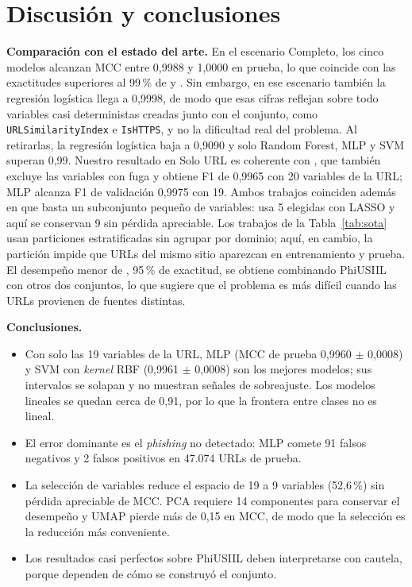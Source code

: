 \documentclass[journal]{IEEEtran}
\begin{document}
\section{Discusión y conclusiones}
\label{sec:conclusiones}
\textbf{Comparación con el estado del arte.} En el escenario Completo, los cinco modelos alcanzan MCC
entre 0,9988 y 1,0000 en prueba, lo que coincide con las exactitudes superiores al 99\,\% de
\cite{prasad2024} y \cite{bao2026}. Sin embargo, en ese escenario también la regresión logística
llega a 0,9998, de modo que esas cifras reflejan sobre todo variables casi deterministas creadas
junto con el conjunto, como \texttt{URLSimilarityIndex} e \texttt{IsHTTPS}, y no la dificultad real
del problema. Al retirarlas, la regresión logística baja a 0,9090 y solo Random Forest, MLP y
SVM superan 0,99. Nuestro resultado en Solo URL es coherente con \cite{yulianti2026}, que también
excluye las variables con fuga y obtiene F1 de 0,9965 con 20 variables de la URL; MLP alcanza F1 de
validación 0,9975 con 19. Ambos trabajos coinciden además en que basta un subconjunto pequeño de
variables: \cite{yulianti2026} usa 5 elegidas con LASSO y aquí se conservan 9 sin pérdida
apreciable. Los trabajos de la Tabla~\ref{tab:sota} usan particiones estratificadas sin agrupar por
dominio; aquí, en cambio, la partición impide que URLs del mismo sitio aparezcan en entrenamiento y
prueba. El desempeño menor de \cite{gobinath2026}, 95\,\%
de exactitud, se obtiene combinando PhiUSIIL con otros dos conjuntos, lo que sugiere que el problema
es más difícil cuando las URLs provienen de fuentes distintas.

\textbf{Conclusiones.}
\begin{itemize}
  \item Con solo las 19 variables de la URL, MLP (MCC de prueba 0,9960 $\pm$ 0,0008) y SVM con
        \textit{kernel} RBF (0,9961 $\pm$ 0,0008) son los mejores modelos; sus intervalos se
        solapan y no muestran señales de sobreajuste. Los modelos lineales se quedan cerca de
        0,91, por lo que la frontera entre clases no es lineal.
  \item El error dominante es el \textit{phishing} no detectado: MLP comete 91 falsos negativos y
        2 falsos positivos en 47.074 URLs de prueba.
  \item La selección de variables reduce el espacio de 19 a 9 variables (52,6\,\%) sin pérdida
        apreciable de MCC. PCA requiere 14 componentes para conservar el desempeño y UMAP pierde
        más de 0,15 en MCC, de modo que la selección es la reducción más conveniente.
  \item Los resultados casi perfectos sobre PhiUSIIL deben interpretarse con cautela, porque
        dependen de cómo se construyó el conjunto.
\end{itemize}
\end{document}
